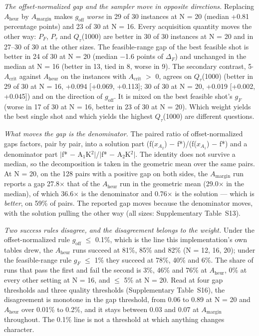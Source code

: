 \documentclass[journal]{IEEEtran}
\begin{document}
\textit{The offset-normalized gap and the sampler move in opposite directions.} Replacing $A_{\mathrm{heur}}$ by $A_{\mathrm{margin}}$ makes $g_{\mathrm{off}}$ \textit{worse} in 29 of 30 instances at N = 20 (median +0.81 percentage points) and 23 of 30 at N = 16. Every acquisition quantity moves the other way: $P_{F}$, $P_{\tau}$ and $Q_{\tau}$(1000) are better in 30 of 30 instances at N = 20 and in 27--30 of 30 at the other sizes. The feasible-range gap of the best feasible shot is better in 24 of 30 at N = 20 (median $-$1.6 points of $\Delta_{F}$) and unchanged in the median at N = 16 (better in 13, tied in 8, worse in 9). The secondary contrast, 5$\cdot$$A_{\mathrm{crit}}$ against $A_{\mathrm{heur}}$ on the instances with $A_{\mathrm{crit}}$ $>$ 0, agrees on $Q_{\tau}$(1000) (better in 29 of 30 at N = 16, +0.094 [+0.069, +0.113]; 30 of 30 at N = 20, +0.019 [+0.002, +0.045]) and on the direction of $g_{\mathrm{off}}$. It is mixed on the best feasible shot's $g_{F}$ (worse in 17 of 30 at N = 16, better in 23 of 30 at N = 20). Which weight yields the best single shot and which yields the highest $Q_{\tau}$(1000) are different questions.


\textit{What moves the gap is the denominator.} The paired ratio of offset-normalized gaps factors, pair by pair, into a solution part (f($x_{{A_{2}}}$) $-$ f*)/(f($x_{{A_{1}}}$) $-$ f*) and a denominator part $|$f* $-$ A$_1$K$^{2}$$|$/$|$f* $-$ A$_2$K$^{2}$$|$. The identity does not survive a median, so the decomposition is taken in the geometric mean over the same pairs. At N = 20, on the 128 pairs with a positive gap on both sides, the $A_{\mathrm{margin}}$ run reports a gap 27.8$\times$ that of the $A_{\mathrm{heur}}$ run in the geometric mean (29.0$\times$ in the median), of which 36.6$\times$ is the denominator and 0.76$\times$ is the solution --- which is \textit{better}, on 59\% of pairs. The reported gap moves because the denominator moves, with the solution pulling the other way (all sizes: Supplementary Table~S13).


\textit{Two success rules disagree, and the disagreement belongs to the weight.} Under the offset-normalized rule $g_{\mathrm{off}}$ $\leq$ 0.1\%, which is the line this implementation's own tables drew, the $A_{\mathrm{heur}}$ runs succeed at 81\%, 85\% and 82\% (N = 12, 16, 20); under the feasible-range rule $g_{F}$ $\leq$ 1\% they succeed at 78\%, 40\% and 6\%. The share of runs that pass the first and fail the second is 3\%, 46\% and 76\% at $A_{\mathrm{heur}}$, 0\% at every other setting at N = 16, and $\leq$ 5\% at N = 20. Read at four gap thresholds and three quality thresholds (Supplementary Table~S16), the disagreement is monotone in the gap threshold, from 0.06 to 0.89 at N = 20 and $A_{\mathrm{heur}}$ over 0.01\% to 0.2\%, and it stays between 0.03 and 0.07 at $A_{\mathrm{margin}}$ throughout. The 0.1\% line is not a threshold at which anything changes character.
\end{document}
